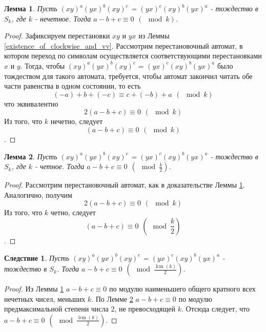 \documentclass[12pt]{article}
\newtheorem{lemma}{Лемма}
\newtheorem{corollary}{Следствие}
\DeclareMathOperator{\lcm}{lcm}
\begin{document}
	\begin{lemma} \label{a-b+c is 0 for odd}
		Пусть $(xy)^a(yx)^b(xy)^c$ = $(yx)^c(xy)^b(yx)^a$ - тождество в $S_k$, где $k$ - нечетное. Тогда $a - b + c \equiv 0 \hspace{5pt} (\mod k)$.
	\end{lemma}
	\begin{proof}
		Зафиксируем перестановки $xy$ и $yx$ из Леммы \ref{existence_of_clockwise_and_vv}.
		Рассмотрим перестановочный автомат, в котором переход по символам осуществляется соответствующими перестановками $x$ и $y$. Тогда, чтобы $(xy)^a(yx)^b(xy)^c$ = $(yx)^c(xy)^b(yx)^a$ было тождеством для такого автомата, требуется, чтобы автомат закончил читать обе части равенства в одном состоянии, то есть	
		\begin{equation}
		(-a) + b + (-c) \equiv c + (-b) + a \hspace{5pt} (\mod k)
		\end{equation}
		что эквивалентно 
		\begin{equation}
		2(a - b + c) \equiv 0 \hspace{5pt} (\mod k)
		\end{equation}
		Из того, что $k$ нечетно, следует 
		$$
		(a - b + c) \equiv 0 \hspace{5pt} (\mod k)
		$$.
	\end{proof}

	\begin{lemma} \label{a-b+c is 0 for even}
		Пусть $(xy)^a(yx)^b(xy)^c$ = $(yx)^c(xy)^b(yx)^a$ - тождество в $S_k$, где $k$ - четное. Тогда $a - b + c \equiv 0 \hspace{5pt} (\mod \frac{k}{2})$.
	\end{lemma}
	\begin{proof}
		Рассмотрим перестановочный автомат, как в доказательстве Леммы \ref{a-b+c is 0 for odd}. Аналогично, получим	
		\begin{equation}
		2(a - b + c) \equiv 0 \hspace{5pt} (\mod k)
		\end{equation}
		Из того, что $k$ четно, следует 
		$$
		(a - b + c) \equiv 0 \hspace{5pt} (\mod \frac{k}{2})
		$$.
	\end{proof}

	\begin{corollary} \label{a-b+c is 0 mod lcm/2}
		Пусть $(xy)^a(yx)^b(xy)^c$ = $(yx)^c(xy)^b(yx)^a$ - тождество в $S_k$. Тогда $a - b + c \equiv 0 \hspace{5pt} (\mod \frac{\lcm(k)}{2})$.
	\end{corollary}
	\begin{proof}
		Из Леммы \ref{a-b+c is 0 for odd} $a - b + c \equiv 0$ по модулю наименьшего общего кратного всех нечетных чисел, меньших $k$.
		По Лемме \ref{a-b+c is 0 for even} $a - b + c \equiv 0$ по модулю предмаксимальной степени числа 2, не превосходящей $k$.
		Отсюда следует, что $a - b + c \equiv 0 \hspace{5pt} (\mod \frac{\lcm(k)}{2})$.
	\end{proof}
\end{document}
